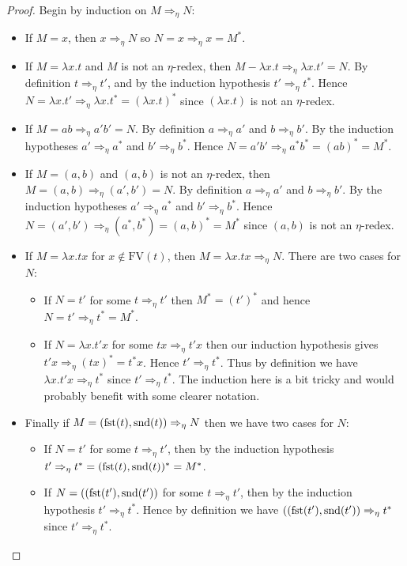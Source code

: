 \begin{proof}
    Begin by induction on $M \Rightarrow_\eta N$:
    \begin{itemize}
        \item If $M = x$, then $x \Rightarrow_\eta N$ so $N  = x \Rightarrow_\eta x = M^*$.
        \item If $M = \lambda x . t$ and $M$ is not an $\eta$-redex, then $M - \lambda x . t \Rightarrow_\eta \lambda x . t' = N$. By definition $t \Rightarrow_\eta t'$, and by the induction hypothesis $t' \Rightarrow_\eta t^*$. Hence $N = \lambda x . t' \Rightarrow_\eta \lambda x . t^* = (\lambda x. t)^*$ since $(\lambda x . t)$ is not an $\eta$-redex.
        \item If $M = a b \Rightarrow_\eta a' b' = N$. By definition $a \Rightarrow_\eta a'$ and $b \Rightarrow_\eta b'$. By the induction hypotheses $a' \Rightarrow_\eta a^*$ and $b' \Rightarrow_\eta b^*$. Hence $N = a'b' \Rightarrow_\eta a^* b^* = (a b)^* = M^*$.
        \item If $M = (a, b)$ and $(a, b)$ is not an $\eta$-redex, then $M = (a, b) \Rightarrow_\eta (a', b') = N$. By definition $a \Rightarrow_\eta a'$ and $b \Rightarrow_\eta b'$. By the induction hypotheses $a' \Rightarrow_\eta a^*$ and $b' \Rightarrow_\eta b^*$. Hence $N = (a',b') \Rightarrow_\eta (a^*, b^*) = (a, b)^* = M^*$ since $(a, b)$ is not an $\eta$-redex.
        \item If $M = \lambda x . t x$ for $x \not\in \mathrm{FV}(t)$, then $M = \lambda x . t x \Rightarrow_\eta N$. There are two cases for $N$:
        \begin{itemize}
            \item If $N = t'$ for some $t \Rightarrow_\eta t'$ then $M^* = (t')^*$ and hence $N = t' \Rightarrow_\eta t^* = M^*$.
            \item If $N = \lambda x . t' x$ for some $t x\Rightarrow_\eta t' x$ then our induction hypothesis gives $t' x \Rightarrow_\eta (t x)^* = t^* x$. Hence $t' \Rightarrow_\eta t^*$. Thus by definition we have $\lambda x . t' x \Rightarrow_\eta t^*$ since $t' \Rightarrow_\eta t^*$. The induction here is a bit tricky and would probably benefit with some clearer notation. 
        \end{itemize}
        \item Finally if $M =(\mathrm{fst}(t), \mathrm{snd}(t)) \Rightarrow_\eta N$ then we have two cases for $N$:
        \begin{itemize}
            \item If $N = t'$ for some $t \Rightarrow_\eta t'$, then by the induction hypothesis $t' \Rightarrow_\eta t^* = (\mathrm{fst}(t), \mathrm{snd}(t))^* = M^*$.
            \item If $N = ((\mathrm{fst}(t'), \mathrm{snd}(t'))$ for some $t \Rightarrow_\eta t'$, then by the induction hypothesis $t' \Rightarrow_\eta t^*$.
            Hence by definition we have $((\mathrm{fst}(t'), \mathrm{snd}(t')) \Rightarrow_\eta t^*$ since $t' \Rightarrow_\eta t^*$.
        \end{itemize}
    \end{itemize}
\end{proof}


